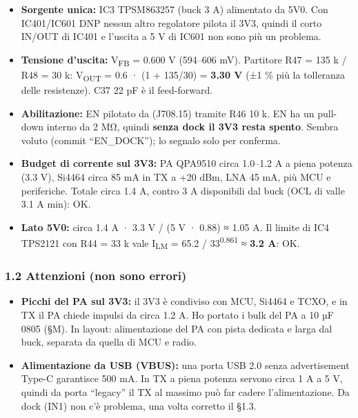 \begin{itemize}
\item \textbf{Sorgente unica:} IC3 TPSM863257 (buck 3 A) alimentato da 5V0. Con IC401/\allowbreak{}IC601 DNP nessun altro regolatore pilota il 3V3, quindi il corto IN/\allowbreak{}OUT di IC401 e l'uscita a 5 V di IC601 non sono più un problema.
\item \textbf{Tensione d'uscita:} V\textsubscript{FB} = 0.600 V (594–606 mV). Partitore R47 = 135 k /\allowbreak{} R48 = 30 k: V\textsubscript{OUT} = 0.6 · (1 + 135/\allowbreak{}30) = \textbf{3.30 V} (±1 \% più la tolleranza delle resistenze). C37 22 pF è il feed-forward.
\item \textbf{Abilitazione:} EN pilotato da  (J708.15) tramite R46 10 k. EN ha un pull-down interno da 2 MΩ, quindi \textbf{senza dock il 3V3 resta spento}. Sembra voluto (commit \textquotedblleft{}EN\_\allowbreak{}DOCK\textquotedblright{}); lo segnalo solo per conferma.
\item \textbf{Budget di corrente sul 3V3:} PA QPA9510 circa 1.0–1.2 A a piena potenza (3.3 V), Si4464 circa 85 mA in TX a +20 dBm, LNA 45 mA, più MCU e periferiche. Totale circa 1.4 A, contro 3 A disponibili dal buck (OCL di valle 3.1 A min): OK.
\item \textbf{Lato 5V0:} circa 1.4 A · 3.3 V /\allowbreak{} (5 V · 0.88) ≈ 1.05 A. Il limite di IC4 TPS2121 con R44 = 33 k vale I\textsubscript{LM} = 65.2 /\allowbreak{} 33\textsuperscript{0.861} ≈ \textbf{3.2 A}: OK.
\end{itemize}

\subsubsection[1.2 Attenzioni (non sono errori)]{1.2 Attenzioni (non sono errori)}

\begin{itemize}
\item \textbf{Picchi del PA sul 3V3:} il 3V3 è condiviso con MCU, Si4464 e TCXO, e in TX il PA chiede impulsi da circa 1.2 A. Ho portato i bulk del PA a 10 µF 0805 (§M). In layout: alimentazione del PA con pista dedicata e larga dal buck, separata da quella di MCU e radio.
\item \textbf{Alimentazione da USB (VBUS):} una porta USB 2.0 senza advertisement Type-C garantisce 500 mA. In TX a piena potenza servono circa 1 A a 5 V, quindi da porta \textquotedblleft{}legacy\textquotedblright{} il TX al massimo può far cadere l'alimentazione. Da dock (IN1) non c'è problema, una volta corretto il §1.3.
\end{itemize}

